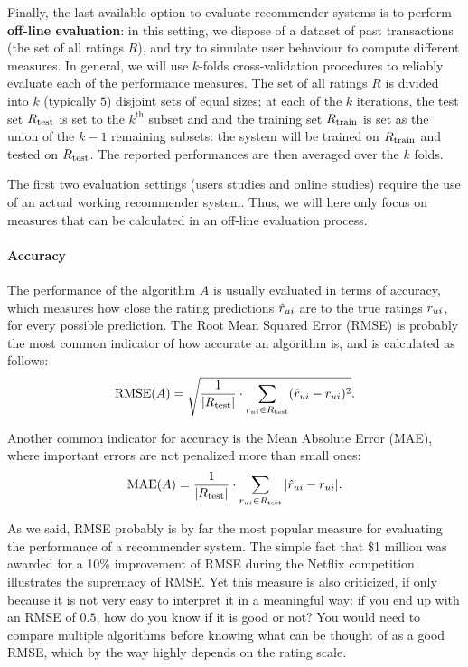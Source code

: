 Finally, the last available option to evaluate recommender systems is to
perform \textbf{off-line evaluation}: in this setting, we dispose of a dataset of past
transactions (the set of all ratings $R$), and try to simulate user behaviour
to compute different measures.  In general, we will use $k$-folds
cross-validation procedures to reliably evaluate each of the performance
measures. The set of all ratings $R$ is divided into $k$ (typically $5$)
disjoint sets of equal sizes; at each of the $k$ iterations, the test set
$R_{\text{test}}$ is set to the $k^{\text{th}}$ subset and and the training set
$R_{\text{train}}$ is set as the union of the $k - 1$ remaining subsets: the system will
be trained on $R_{\text{train}}$ and tested on $R_{\text{test}}$. The reported performances are
then averaged over the $k$ folds.

The first two evaluation settings (users studies and online studies) require
the use of an actual working recommender system. Thus, we will here only focus
on measures that can be calculated in an off-line evaluation process.

\paragraph{Accuracy\\}
The performance of the algorithm $A$ is usually evaluated in terms of accuracy,
which measures how close the rating predictions $\hat{r}_{ui}$ are to the true
ratings $r_{ui}$, for every possible prediction. The Root Mean Squared Error
(RMSE) is probably the most common indicator of how accurate an algorithm is,
and is calculated as follows:
$$\text{RMSE}(A) = \sqrt{\frac{1}{|R_{\text{test}}|} \cdot \sum_{r_{ui} \in
R_{\text{test}}}(\hat{r}_{ui} - r_{ui})^2}.$$

Another common indicator for accuracy is the Mean Absolute Error (MAE), where
important errors are not penalized more than small ones:
$$\text{MAE}(A) = \frac{1}{|R_{\text{test}}|} \cdot \sum_{r_{ui} \in R_{\text{test}}}|\hat{r}_{ui} -
r_{ui}|.$$

As we said, RMSE probably is by far the most popular measure for
evaluating the performance of a recommender system. The simple fact that \$1
million was awarded for a 10\% improvement of RMSE during the Netflix competition
illustrates the supremacy of RMSE. Yet this measure is also criticized, if
only because it is not very easy to interpret it in a meaningful way: if you
end up with an RMSE of $0.5$, how do you know if it is good or not? You would
need to compare multiple algorithms before knowing what can be thought of as a
good RMSE, which by the way highly depends on  the rating scale.

